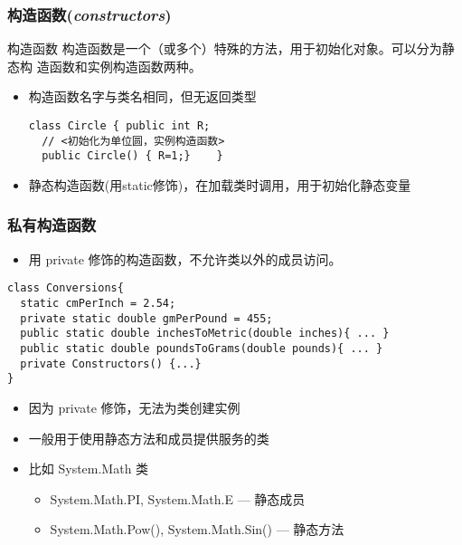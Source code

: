 \begin{frame}[fragile]
\frametitle{构造函数(\textit{constructors})}
\begin{block}{构造函数}
  \CJKindent 构造函数是一个（或多个）特殊的方法，用于初始化对象。可以分为静态构
  造函数和实例构造函数两种。
\end{block}
\pause \medskip
\begin{itemize}
\item 构造函数名字与类名相同，但无返回类型
\begin{lstlisting}[escapeinside=<>]
class Circle { public int R;
  // <初始化为单位圆，实例构造函数>
  public Circle() { R=1;}    }
\end{lstlisting}
  \pause \medskip
\item 静态构造函数(用static修饰)，在加载类时调用，用于初始化静态变量
\end{itemize}
\end{frame}

\begin{frame}[fragile]
\frametitle{私有构造函数}
\begin{itemize}
\item 用 private 修饰的构造函数，不允许类以外的成员访问。
\end{itemize}
\begin{lstlisting}
class Conversions{
  static cmPerInch = 2.54;
  private static double gmPerPound = 455;
  public static double inchesToMetric(double inches){ ... }
  public static double poundsToGrams(double pounds){ ... }
  private Constructors() {...}
}
\end{lstlisting}
\pause
\begin{itemize}
\item 因为 private 修饰，无法为类创建实例
\item 一般用于使用静态方法和成员提供服务的类
\pause
\item 比如 System.Math 类
\begin{itemize}
\item System.Math.PI, System.Math.E   --- 静态成员
\item System.Math.Pow(), System.Math.Sin() --- 静态方法
\end{itemize}
\end{itemize}

\end{frame}


